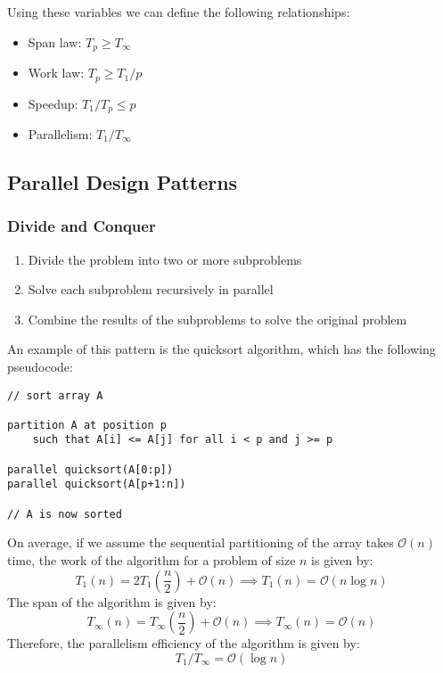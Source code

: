 \documentclass{article}
\begin{document}
Using these variables we can define the following relationships:
\begin{itemize}
    \item Span law: \(T_p \geqslant T_\infty\)
    \item Work law: \(T_p \geqslant T_1 / p\)
    \item Speedup: \(T_1 / T_p \leqslant p\)
    \item Parallelism: \(T_1 / T_\infty\)
\end{itemize}
\subsection{Parallel Design Patterns}
\subsubsection{Divide and Conquer}
\begin{enumerate}
    \item Divide the problem into two or more subproblems
    \item Solve each subproblem recursively in parallel
    \item Combine the results of the subproblems to solve the original
          problem
\end{enumerate}
An example of this pattern is the quicksort algorithm, which has the
following pseudocode:
\begin{verbatim}
// sort array A

partition A at position p
    such that A[i] <= A[j] for all i < p and j >= p

parallel quicksort(A[0:p])
parallel quicksort(A[p+1:n])

// A is now sorted
\end{verbatim}
On average, if we assume the sequential partitioning of the array takes
\(\mathcal{O}\left( n \right)\) time, the work of the algorithm for a
problem of size \(n\) is given by:
\begin{equation*}
    T_1\left( n \right) = 2T_1\left( \frac{n}{2} \right) + \mathcal{O}\left( n \right) \implies T_1\left( n \right) = \mathcal{O}\left( n \log n \right)
\end{equation*}
The span of the algorithm is given by:
\begin{equation*}
    T_\infty\left( n \right) = T_\infty\left( \frac{n}{2} \right) + \mathcal{O}\left( n \right) \implies T_\infty\left( n \right) = \mathcal{O}\left( n \right)
\end{equation*}
Therefore, the parallelism efficiency of the algorithm is given by:
\begin{equation*}
    T_1 / T_\infty = \mathcal{O}\left( \log n \right)
\end{equation*}
\end{document}
